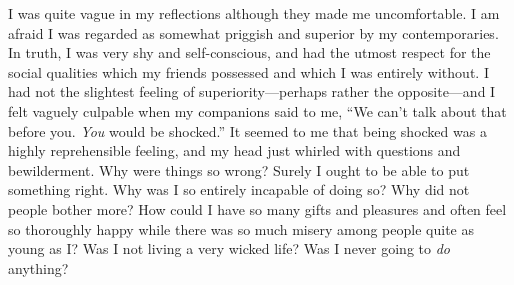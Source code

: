 I was quite vague in my reflections although they
made me uncomfortable. I am afraid I was regarded as
somewhat priggish and superior by my contemporaries.
In truth, I was very shy and self-conscious, and had the
utmost respect for the social qualities which my friends
possessed and which I was entirely without. I had not
the slightest feeling of superiority—perhaps rather the
opposite—and I felt vaguely culpable when my
companions said to me, “We can’t talk about that before you.
\textsl{You} would be shocked.” It seemed to me that being
shocked was a highly reprehensible feeling, and my head
just whirled with questions and bewilderment. Why
were things so wrong? Surely I ought to be able to put
something right. Why was I so entirely incapable of
doing so? Why did not people bother more? How could
I have so many gifts and pleasures and often feel so
thoroughly happy while there was so much misery among
people quite as young as I? Was I not living a very
wicked life? Was I never going to \textsl{do} anything?

